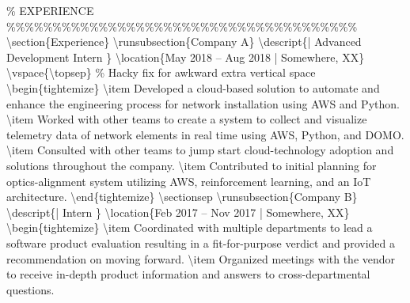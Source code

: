 \documentclass{article}%
\begin{document}
\%     EXPERIENCE\newline%
\%\%\%\%\%\%\%\%\%\%\%\%\%\%\%\%\%\%\%\%\%\%\%\%\%\%\%\%\%\%\%\%\%\%\%\%\%\%\newline%
\newline%
\textbackslash{}section\{Experience\}\newline%
\textbackslash{}runsubsection\{Company A\}\newline%
\textbackslash{}descript\{| Advanced Development Intern \}\newline%
\textbackslash{}location\{May 2018 – Aug 2018 | Somewhere, XX\}\newline%
\textbackslash{}vspace\{\textbackslash{}topsep\} \% Hacky fix for awkward extra vertical space\newline%
\textbackslash{}begin\{tightemize\}\newline%
\textbackslash{}item Developed a cloud{-}based solution to automate and enhance the engineering process for network installation using AWS and Python.\newline%
\textbackslash{}item Worked with other teams to create a system to collect and visualize telemetry data of network elements in real time using AWS, Python, and DOMO.\newline%
\textbackslash{}item Consulted with other teams to jump start cloud{-}technology adoption and solutions throughout the company.\newline%
\textbackslash{}item Contributed to initial planning for optics{-}alignment system utilizing AWS, reinforcement learning, and an IoT architecture.\newline%
\textbackslash{}end\{tightemize\}\newline%
\textbackslash{}sectionsep\newline%
\newline%
\textbackslash{}runsubsection\{Company B\}\newline%
\textbackslash{}descript\{| Intern \}\newline%
\textbackslash{}location\{Feb 2017 – Nov 2017 | Somewhere, XX\}\newline%
\textbackslash{}begin\{tightemize\}\newline%
\textbackslash{}item Coordinated with multiple departments to lead a software product evaluation resulting in a fit{-}for{-}purpose verdict and provided a recommendation on moving forward.\newline%
\textbackslash{}item Organized meetings with the vendor to receive in{-}depth product information and answers to cross{-}departmental questions.\newline%
\end{document}
